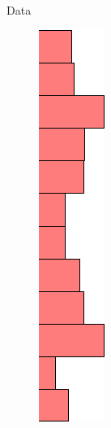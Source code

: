 \documentclass{beamer}
\begin{document}
\begin{frame}{Data}
\begin{minipage}[t]{0.02\columnwidth}
\begin{figure}[h]
		\includegraphics[width=3.135\linewidth]{hist2.png}
	\end{figure}
\end{minipage}

\end{frame}
\end{document}
